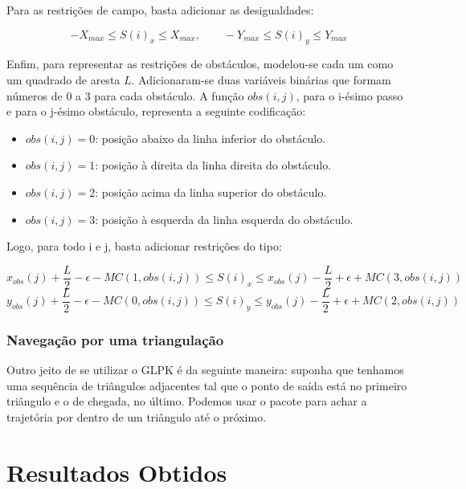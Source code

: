 \documentclass[a4paper,12pt]{article}
\begin{document}
Para as restrições de campo, basta adicionar as desigualdades:

\begin{equation}
	-X_{max} \leqslant S(i)_{x} \leqslant X_{max}, \qquad -Y_{max} \leqslant S(i)_{y} \leqslant Y_{max}
\end{equation}

Enfim, para representar as restrições de obstáculos, modelou-se cada um como um quadrado de aresta $L$. Adicionaram-se duas variáveis binárias que formam números de 0 a 3 para cada obstáculo. A função $obs(i, j)$, para o i-ésimo passo e para o j-ésimo obstáculo, representa a seguinte codificação:

\begin{itemize}
\item $obs(i, j) = 0$: posição abaixo da linha inferior do obstáculo.
\item $obs(i, j) = 1$: posição à direita da linha direita do obstáculo.
\item $obs(i, j) = 2$: posição acima da linha superior do obstáculo.
\item $obs(i, j) = 3$: posição à esquerda da linha esquerda do obstáculo.
\end{itemize}

Logo, para todo i e j, basta adicionar restrições do tipo:

\begin{equation}
	x_{obs}(j) +  \frac{L}{2} - \epsilon - MC(1,obs(i,j)) \leq S(i)_x \leq x_{obs}(j) - \frac{L}{2} + \epsilon + MC(3,obs(i,j))
\end{equation}
\begin{equation}
	y_{obs}(j) +  \frac{L}{2} - \epsilon - MC(0,obs(i,j)) \leq S(i)_y \leq y_{obs}(j) -  \frac{L}{2} + \epsilon  + MC(2,obs(i,j))
\end{equation}

\subsubsection{Navegação por uma triangulação}

Outro jeito de se utilizar o GLPK é da seguinte maneira: suponha que tenhamos uma sequência de triângulos adjacentes tal que o ponto de saída está no primeiro triângulo e o de chegada, no último. Podemos usar o pacote para achar a trajetória por dentro de um triângulo até o próximo.


\section{Resultados Obtidos}
	\label{secao: resultados_obtidos}
    
\end{document}
